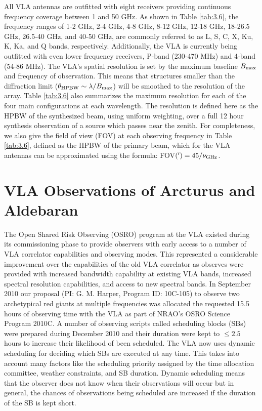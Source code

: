All VLA antennas are outfitted with eight receivers providing continuous frequency coverage between 1 and 50 GHz. As shown in Table \ref{tab:3.6}, the frequency ranges of 1-2 GHz, 2-4 GHz, 4-8 GHz, 8-12 GHz, 12-18 GHz, 18-26.5 GHz, 26.5-40 GHz, and 40-50 GHz, are commonly referred to as L, S, C, X, Ku, K, Ka, and Q bands, respectively. Additionally, the VLA is currently being outfitted with even lower frequency receivers, P-band (230-470 MHz) and 4-band (54-86 MHz). The VLA's spatial resolution is set by the maximum baseline $B_{\rm{max}}$ and frequency of observation. This means that structures smaller than the diffraction limit ($\theta_{\rm{HPBW}} \sim \lambda/B_{\rm{max}}$) will be smoothed to the resolution of the array. Table \ref{tab:3.6} also summarizes the maximum resolution for each of the four main configurations at each wavelength. The resolution is defined here as the HPBW of the synthesized beam, using uniform weighting, over a full 12 hour synthesis observation of a source which passes near the zenith. For completeness, we also give the field of view (FOV) at each observing frequency in Table \ref{tab:3.6}, defined as the HPBW  of the primary beam, which for the VLA antennas can be approximated using the formula: FOV$(')= 45/\nu _{\rm{GHz}}$. 

\section{VLA Observations of Arcturus and Aldebaran}\label{sec:3.6}

The Open Shared Risk Observing (OSRO) program at the VLA existed during its commissioning phase to provide observers with early access to a number of VLA correlator capabilities and observing modes. This represented a considerable improvement over the capabilities of the old VLA correlator as observes were provided with increased bandwidth capability at existing VLA bands, increased spectral resolution capabilities, and access to new spectral bands. In September 2010 our proposal (PI: G. M. Harper, Program ID: 10C-105) to observe two archetypical red giants at multiple frequencies was allocated the requested 15.5 hours of observing time with the VLA as part of NRAO's OSRO Science Program 2010C. A number of observing scripts called scheduling blocks (SBs) were prepared during December 2010 and their duration were kept to $\leq 2.5$ hours to increase their likelihood of been scheduled. The VLA now uses dynamic scheduling for deciding which SBs are executed at any time. This takes into account many factors like the scheduling priority assigned by the time allocation committee, weather constraints, and SB duration. Dynamic scheduling means that the observer does not know when their observations will occur but in general, the chances of observations being scheduled are increased if the duration of the SB is kept short.

